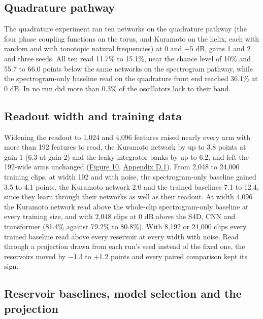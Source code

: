 \documentclass{article}
\begin{document}
\subsection{Quadrature pathway}\label{sec-4-6}

The quadrature experiment ran ten networks on the quadrature pathway
(the four phase coupling functions on the torus, and Kuramoto on the
helix, each with random and with tonotopic natural frequencies) at 0 and
\ensuremath{-}5 dB, gains 1 and 2 and three seeds. All ten read 11.7\%
to 15.1\%, near the chance level of 10\% and 55.7 to 66.0 points below
the same networks on the spectrogram pathway, while the spectrogram-only
baseline read on the quadrature front end reached 36.1\% at 0 dB. In no
run did more than 0.3\% of the oscillators lock to their band.

\subsection{Readout width and training data}\label{sec-4-7}

Widening the readout to 1,024 and 4,096 features raised nearly every arm
with more than 192 features to read, the Kuramoto network by up to 3.8
points at gain 1 (6.3 at gain 2) and the leaky-integrator banks by up to
6.2, and left the 192-wide arms unchanged
(\hyperref[fig-fig07-sec4-7-readout-width]{Figure 10},
\hyperref[sec-D-1]{Appendix D.1}). From 2,048 to 24,000 training clips,
at width 192 and with noise, the spectrogram-only baseline gained 3.5 to
4.1 points, the Kuramoto network 2.0 and the trained baselines 7.1 to
12.4, since they learn through their networks as well as their readout.
At width 4,096 the Kuramoto network read above the whole-clip
spectrogram-only baseline at every training size, and with 2,048 clips
at 0 dB above the S4D, CNN and transformer (81.4\% against 79.2\% to
80.8\%). With 8,192 or 24,000 clips every trained baseline read above
every reservoir at every width with noise. Read through a projection
drawn from each run's seed instead of the fixed one, the reservoirs
moved by \ensuremath{-}1.3 to +1.2 points and every paired comparison
kept its sign.

\subsection{Reservoir baselines, model selection and the
projection}\label{sec-4-8}
\end{document}

